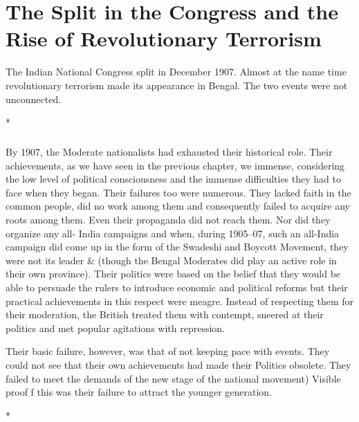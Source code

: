 \chapter[Split in the Congress and Revolutionary Terrorism]{The Split in the Congress and the Rise of Revolutionary Terrorism}

The Indian National Congress split in December 1907. Almost at the name time revolutionary terrorism made its appearance in Bengal. The two events were not unconnected.

\begin{center}*\end{center}

\paragraph*{}

By 1907, the Moderate nationalists had exhausted their historical role. Their achievements, as we have seen in the previous chapter, we immense, considering the low level of political consciousness and the immense difficulties they had to face when they began. Their failures too were numerous. They lacked faith in the common people, did no work among them and consequently failed to acquire any roots among them. Even their propaganda did not reach them. Nor did they organize any all- India campaigns and when, during 1905--07, such an all-India campaign did come up in the form of the Swadeshi and Boycott Movement, they were not its leader \& (though the Bengal Moderates did play an active role in their own province). Their politics were based on the belief that they would be able to persuade the rulers to introduce economic and political reforms but their practical achievements in this respect were meagre. Instead of respecting them for their moderation, the British treated them with contempt, sneered at their politics and met popular agitations with repression.

Their basic failure, however, was that of not keeping pace with events. They could not see that their own achievements had made their Politics obsolete. They failed to meet the demands of the new stage of the national movement) Visible proof f this was their failure to attract the younger generation.

\begin{center}*\end{center}

\paragraph*{}

